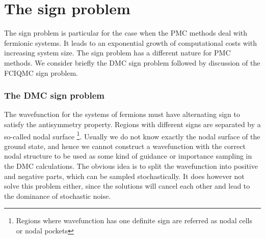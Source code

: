 \documentclass[twoside,english]{uiofysmaster}
\begin{document}
\section{The sign problem}
The sign problem is particular for the case when the PMC methods deal
with fermionic systems. It leads to an exponential growth of
computational costs with increasing system size. The sign problem has
a different nature for PMC methods. We consider briefly the DMC sign
problem followed by discussion of the FCIQMC sign problem.

\subsubsection{The DMC sign problem}

The wavefunction for the systems of fermions must have alternating
sign to satisfy the antisymmetry property. Regions with different signs
are separated by a so-called nodal surface \footnote{Regions where
	wavefunction has one definite sign are referred as nodal cells or
	nodal pockets}. Usually we do not know exactly the nodal surface of
the ground state, and hence we cannot construct a wavefunction with the
correct nodal structure to be used as some kind of guidance or
importance sampling in the DMC calculations. The obvious idea is to split
the wavefunction into positive and negative parts, which can be sampled
stochastically. It does however not solve this problem either, since the
solutions will cancel each other and lead to the dominance of
stochastic noise.
\end{document}
